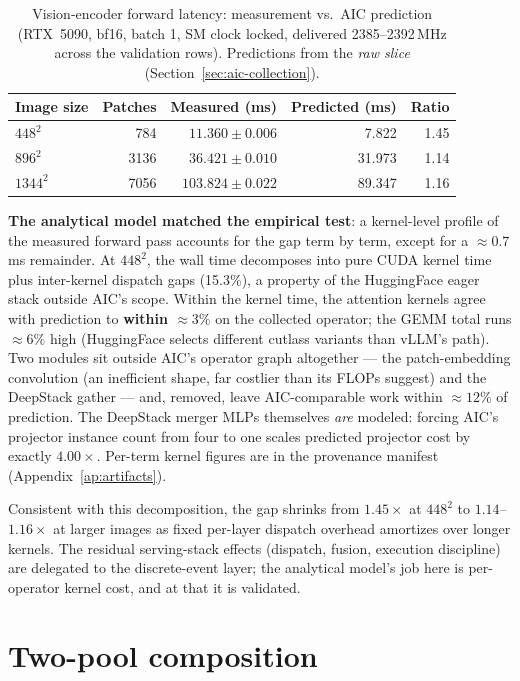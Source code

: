 \begin{table}[htbp]
\centering
\caption{Vision-encoder forward latency: measurement vs.\ AIC prediction
(RTX~5090, bf16, batch 1, SM clock locked,
delivered 2385--2392\,\si{\mega\hertz} across the validation rows).
Predictions from the \emph{raw slice} (Section~\ref{sec:aic-collection}).}
\label{tab:aic-validation}
\begin{tabular}{lrrrr}
\toprule
Image size & Patches & Measured (ms) & Predicted (ms) & Ratio \\
\midrule
$448^2$  & 784   & $11.360 \pm 0.006$  & 7.822  & 1.45 \\
$896^2$  & 3136  & $36.421 \pm 0.010$  & 31.973 & 1.14 \\
$1344^2$ & 7056  & $103.824 \pm 0.022$ & 89.347 & 1.16 \\
\bottomrule
\end{tabular}
\end{table}

\textbf{The analytical model matched the empirical test}: a kernel-level
profile of the measured forward pass accounts for the gap term by term,
except for a ${\approx}0.7$\,ms remainder. At $448^2$, the wall time
decomposes into pure CUDA kernel time plus inter-kernel dispatch gaps
(15.3\%), a property of the HuggingFace eager stack outside AIC's scope.
Within the kernel time, the attention kernels agree with prediction to
\textbf{within ${\approx}3\%$} on the collected operator; the GEMM total
runs ${\approx}6\%$ high (HuggingFace selects different cutlass variants
than vLLM's path). Two modules sit outside AIC's operator graph
altogether --- the patch-embedding convolution (an inefficient shape, far
costlier than its FLOPs suggest) and the DeepStack gather --- and, removed,
leave AIC-comparable work within ${\approx}12\%$ of prediction. The
DeepStack merger MLPs themselves \emph{are} modeled: forcing AIC's
projector instance count from four to one scales predicted projector cost
by exactly $4.00\times$. Per-term kernel figures are in the provenance
manifest (Appendix~\ref{ap:artifacts}).

Consistent with this decomposition, the gap shrinks from $1.45\times$ at
$448^2$ to $1.14$--$1.16\times$ at larger images as fixed per-layer dispatch
overhead amortizes over longer kernels. The residual serving-stack effects
(dispatch, fusion, execution discipline) are delegated to the discrete-event
layer; the analytical model's job here is per-operator kernel cost, and at
that it is validated.

\section{Two-pool composition}
\label{sec:aic-twopool}

